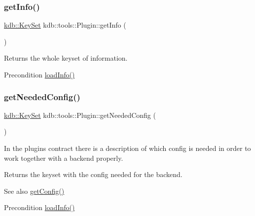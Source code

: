 \subsubsection{\texorpdfstring{get\+Info()}{getInfo()}}
{\footnotesize\ttfamily \hyperlink{classkdb_1_1KeySet}{kdb\+::\+Key\+Set} kdb\+::tools\+::\+Plugin\+::get\+Info (\begin{DoxyParamCaption}{ }\end{DoxyParamCaption})\hspace{0.3cm}{\ttfamily [inline]}}



Returns the whole keyset of information. 

\begin{DoxyPrecond}{Precondition}
\hyperlink{classkdb_1_1tools_1_1Plugin_a3a0c6a956d1714002ef9baf8c9d99167}{load\+Info()} 
\end{DoxyPrecond}
\mbox{\label{classkdb_1_1tools_1_1Plugin_ad2a0a4a64d17c479e7cd8b1402275cc7}} 
\subsubsection{\texorpdfstring{get\+Needed\+Config()}{getNeededConfig()}}
{\footnotesize\ttfamily \hyperlink{classkdb_1_1KeySet}{kdb\+::\+Key\+Set} kdb\+::tools\+::\+Plugin\+::get\+Needed\+Config (\begin{DoxyParamCaption}{ }\end{DoxyParamCaption})}



In the plugin\textquotesingle{}s contract there is a description of which config is needed in order to work together with a backend properly. 

\begin{DoxyReturn}{Returns}
the keyset with the config needed for the backend. 
\end{DoxyReturn}
\begin{DoxySeeAlso}{See also}
\hyperlink{classkdb_1_1tools_1_1Plugin_af3004444f5ef05dc8106646ff2b95694}{get\+Config()} 
\end{DoxySeeAlso}
\begin{DoxyPrecond}{Precondition}
\hyperlink{classkdb_1_1tools_1_1Plugin_a3a0c6a956d1714002ef9baf8c9d99167}{load\+Info()} 
\end{DoxyPrecond}
\mbox{\label{classkdb_1_1tools_1_1Plugin_aca31140802ab463d5bddd95dee73194d}} 
